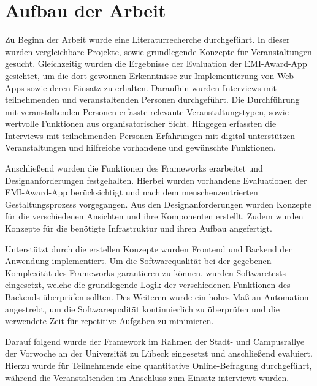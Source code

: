\section{Aufbau der Arbeit}

Zu Beginn der Arbeit wurde eine Literaturrecherche durchgeführt. In dieser
wurden vergleichbare Projekte, sowie grundlegende Konzepte für Veranstaltungen
gesucht. Gleichzeitig wurden die Ergebnisse der Evaluation der EMI-Award-App
gesichtet, um die dort gewonnen Erkenntnisse zur Implementierung von Web-Apps
sowie deren Einsatz zu erhalten. Daraufhin wurden Interviews mit teilnehmenden
und veranstaltenden Personen durchgeführt. Die Durchführung mit veranstaltenden
Personen erfasste relevante Veranstaltungstypen, sowie wertvolle Funktionen aus
organisatorischer Sicht. Hingegen erfassten die Interviews mit teilnehmenden
Personen Erfahrungen mit digital unterstützen Veranstaltungen und hilfreiche
vorhandene und gewünschte Funktionen.

Anschließend wurden die Funktionen des Frameworks erarbeitet und
Designanforderungen festgehalten. Hierbei wurden vorhandene Evaluationen der
EMI-Award-App berücksichtigt und nach dem menschenzentrierten Gestaltungsprozess
vorgegangen. Aus den Designanforderungen wurden Konzepte für die verschiedenen
Ansichten und ihre Komponenten erstellt. Zudem wurden Konzepte für die benötigte
Infrastruktur und ihren Aufbau angefertigt.

Unterstützt durch die erstellen Konzepte wurden Frontend und Backend der
Anwendung implementiert. Um die Softwarequalität bei der gegebenen Komplexität
des Frameworks garantieren zu können, wurden Softwaretests eingesetzt, welche
die grundlegende Logik der verschiedenen Funktionen des Backends überprüfen
sollten. Des Weiteren wurde ein hohes Maß an Automation angestrebt, um die
Softwarequalität kontinuierlich zu überprüfen und die verwendete Zeit für
repetitive Aufgaben zu minimieren.

Darauf folgend wurde der Framework im Rahmen der Stadt- und Campusrallye der
Vorwoche an der Universität zu Lübeck eingesetzt und anschließend evaluiert.
Hierzu wurde für Teilnehmende eine quantitative Online-Befragung durchgeführt,
während die Veranstaltenden im Anschluss zum Einsatz interviewt wurden.
